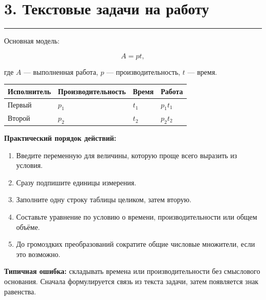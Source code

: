 \documentclass[a4paper,12pt]{article}
\newcommand{\topicline}{
    \textcolor{accent}{\rule{\linewidth}{0.6pt}}
}
\begin{document}
\clearpage


\section*{3. Текстовые задачи на работу}
\topicline

Основная модель:

\[
A=pt,
\]

где $A$ --- выполненная работа,
$p$ --- производительность,
$t$ --- время.

\begin{center}
\begin{tabularx}{\linewidth}{@{}lXXX@{}}
\toprule
Исполнитель
&
Производительность
&
Время
&
Работа
\\
\midrule
Первый
&
$p_1$
&
$t_1$
&
$p_1t_1$
\\
Второй
&
$p_2$
&
$t_2$
&
$p_2t_2$
\\
\bottomrule
\end{tabularx}
\end{center}

\textbf{Практический порядок действий:}

\begin{enumerate}
    \item
    Введите переменную для величины,
    которую проще всего выразить из условия.

    \item
    Сразу подпишите единицы измерения.

    \item
    Заполните одну строку таблицы целиком,
    затем вторую.

    \item
    Составьте уравнение по условию
    о времени, производительности
    или общем объёме.

    \item
    До громоздких преобразований
    сократите общие числовые множители,
    если это возможно.
\end{enumerate}

\textbf{Типичная ошибка:}
складывать времена или производительности без смыслового основания.
Сначала формулируется связь из текста задачи,
затем появляется знак равенства.

\end{document}
